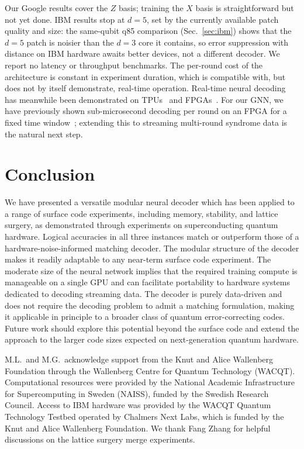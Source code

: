 \documentclass[aps,prxquantum,twocolumn,superscriptaddress,nofootinbib]{revtex4-2}
\begin{document}
Our Google results cover the $Z$ basis; training the $X$ basis is straightforward but not yet done. IBM results stop at $d=5$, set by the currently available patch quality and size: the same-qubit q85 comparison (Sec.~\ref{sec:ibm}) shows that the $d=5$ patch is noisier than the $d=3$ core it contains, so error suppression with distance on IBM hardware awaits better devices, not a different decoder. We report no latency or throughput benchmarks. The per-round cost of the architecture is constant in experiment duration, which is compatible with, but does not by itself demonstrate, real-time operation. Real-time neural decoding has meanwhile been demonstrated on TPUs~\cite{senior2025alphaqubit2,zhang2026parallel} and FPGAs~\cite{yang2026realtime}. For our GNN, we have previously shown sub-microsecond decoding per round on an FPGA for a fixed time window~\cite{cicero2026lowlatencygnnaccelerator}; extending this to streaming multi-round syndrome data is the natural next step.

\section{Conclusion}
\label{sec:conclusion}

We have presented a versatile modular neural decoder which has been applied to a range of surface code experiments, including memory, stability, and lattice surgery, as demonstrated through experiments on superconducting quantum hardware. Logical accuracies in all three instances match or outperform those of a hardware-noise-informed matching decoder. The modular structure of the decoder makes it readily adaptable to any near-term surface code experiment. The moderate size of the neural network implies that the required training compute is manageable on a single GPU and can facilitate portability to hardware systems dedicated to decoding streaming data. The decoder is purely data-driven and does not require the decoding problem to admit a matching formulation, making it applicable in principle to a broader class of quantum error-correcting codes. Future work should explore this potential beyond the surface code and extend the approach to the larger code sizes expected on next-generation quantum hardware.

\begin{acknowledgments}

M.L.\ and M.G.\ acknowledge support from the Knut and Alice Wallenberg Foundation through the Wallenberg Centre for Quantum Technology (WACQT). Computational resources were provided by the National Academic Infrastructure for Supercomputing in Sweden (NAISS), funded by the Swedish Research Council. Access to IBM hardware was provided by the WACQT Quantum Technology Testbed operated by Chalmers Next Labs, which is funded by the Knut and Alice Wallenberg Foundation. We thank Fang Zhang for helpful discussions on the lattice surgery merge experiments.
\end{acknowledgments}
\end{document}
